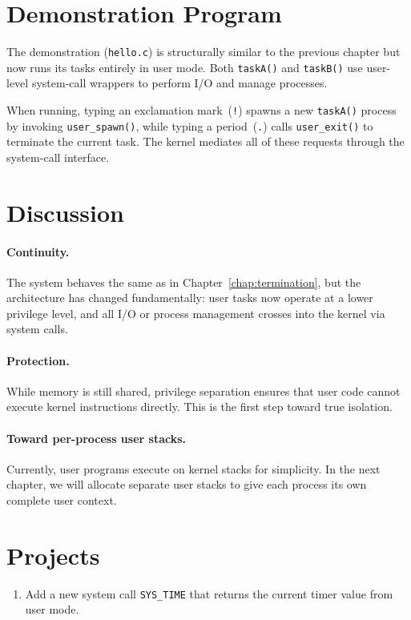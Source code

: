 \section{Demonstration Program}

The demonstration (\texttt{hello.c}) is structurally similar to the previous
chapter but now runs its tasks entirely in user mode.  Both \texttt{taskA()} and
\texttt{taskB()} use user-level system-call wrappers to perform I/O and manage
processes.

When running, typing an exclamation mark~(\texttt{!}) spawns a new
\texttt{taskA()} process by invoking \texttt{user\_spawn()}, while typing a
period~(\texttt{.}) calls \texttt{user\_exit()} to terminate the current task.
The kernel mediates all of these requests through the system-call interface.

\begin{figure}[H]
\centering

\end{figure}

\section{Discussion}

\paragraph{Continuity.}
The system behaves the same as in Chapter~\ref{chap:termination}, but the
architecture has changed fundamentally: user tasks now operate at a lower
privilege level, and all I/O or process management crosses into the kernel via
system calls.

\paragraph{Protection.}
While memory is still shared, privilege separation ensures that user code cannot
execute kernel instructions directly.  This is the first step toward true
isolation.

\paragraph{Toward per-process user stacks.}
Currently, user programs execute on kernel stacks for simplicity.  In the next
chapter, we will allocate separate user stacks to give each process its own
complete user context.

\section*{Projects}

\begin{enumerate}
  \item Add a new system call \texttt{SYS\_TIME} that returns the current timer
        value from user mode.
\end{enumerate}
